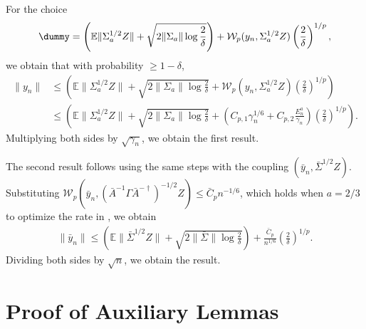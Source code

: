 \documentclass[11pt]{article}
\begin{document}
For the choice
\begin{align*}
    \dummy = \left(\mathbb{E}\lVert \Sigma_a^{1/2}Z \rVert + \sqrt{2 \lVert \Sigma_a \rVert \log \frac{2}{\delta}} \right)  +
    \mathcal{W}_p (y_n, \Sigma_a^{1/2} Z) \left( \frac{2}{\delta} \right)^{1/p} , 
\end{align*}
we obtain that with probability $\geq 1 - \delta$,
\begin{align*}
    \lVert y_n \rVert 
    &\leq \left(\mathbb{E}\lVert \Sigma_a^{1/2} Z \rVert + \sqrt{2 \lVert \Sigma_a \rVert \log \frac{2}{\delta}} + \mathcal{W}_p (y_n, \Sigma_a^{1/2} Z) \left(\frac{2}{\delta} \right)^{1/p} \right)        
    \\     
    &\leq \left(\mathbb{E}\lVert \Sigma_a^{1/2} Z \rVert + \sqrt{2 \lVert \Sigma_a \rVert \log \frac{2}{\delta}} + \left(C_{p, 1} \gamma_n^{1/6} + C_{p, 2} \frac{E_n^a}{\gamma_n} \right) \left(\frac{2}{\delta} \right)^{1/p} \right)         .
\end{align*}
Multiplying both sides by $\sqrt{\gamma_n}$, we obtain the first result. 


The second result follows using the same steps with the coupling $(\bar{y}_n, \bar{\Sigma}^{1/2}Z)$. 
Substituting $\mathcal{W}_p (\bar{y}_n, (\bar{A}^{-1} \Gamma \bar{A}^{-\dagger})^{-1/2} Z) \leq \bar{C}_p n^{-1/6}$, which holds when $a = 2/3$ to optimize the rate in , we obtain
\begin{align*}
    \lVert \bar{y}_n \rVert 
    \leq 
    \left( 
    \mathbb{E}\lVert \bar{\Sigma}^{1/2}Z \rVert
    + \sqrt{2 \lVert \bar{\Sigma} \rVert \log \frac{2}{\delta}}
    \right)
    + 
    \frac{\bar{C}_{p}}{n^{1/6}} \left(\frac{2}{\delta} \right)^{1/p} . 
\end{align*}
Dividing both sides by $\sqrt{n}$, we obtain the result. 



\section{Proof of Auxiliary Lemmas}
\end{document}
